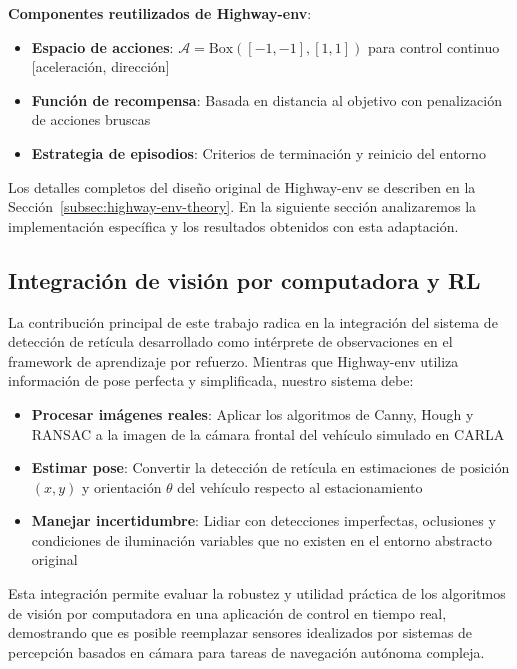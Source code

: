 \textbf{Componentes reutilizados de Highway-env}:
\begin{itemize}
    \item \textbf{Espacio de acciones}: $\mathcal{A} = \text{Box}([-1, -1], [1, 1])$ para control continuo [aceleración, dirección]
    \item \textbf{Función de recompensa}: Basada en distancia al objetivo con penalización de acciones bruscas
    \item \textbf{Estrategia de episodios}: Criterios de terminación y reinicio del entorno
\end{itemize}


Los detalles completos del diseño original de Highway-env se describen en la
Sección~\ref{subsec:highway-env-theory}. En la siguiente sección analizaremos
la implementación específica y los resultados obtenidos con esta adaptación.

\subsection{Integración de visión por computadora y RL}\label{subsec:rl-integration}

La contribución principal de este trabajo radica en la integración del sistema de
detección de retícula desarrollado como intérprete de observaciones en el framework
de aprendizaje por refuerzo. Mientras que Highway-env utiliza información de pose
perfecta y simplificada, nuestro sistema debe:

\begin{itemize}
    \item \textbf{Procesar imágenes reales}: Aplicar los algoritmos de Canny, Hough y RANSAC
    a la imagen de la cámara frontal del vehículo simulado en CARLA
    \item \textbf{Estimar pose}: Convertir la detección de retícula en estimaciones de
    posición $(x,y)$ y orientación $\theta$ del vehículo respecto al estacionamiento
    \item \textbf{Manejar incertidumbre}: Lidiar con detecciones imperfectas, oclusiones
    y condiciones de iluminación variables que no existen en el entorno abstracto original
\end{itemize}


Esta integración permite evaluar la robustez y utilidad práctica de los algoritmos
de visión por computadora en una aplicación de control en tiempo real, demostrando
que es posible reemplazar sensores idealizados por sistemas de percepción basados
en cámara para tareas de navegación autónoma compleja.
